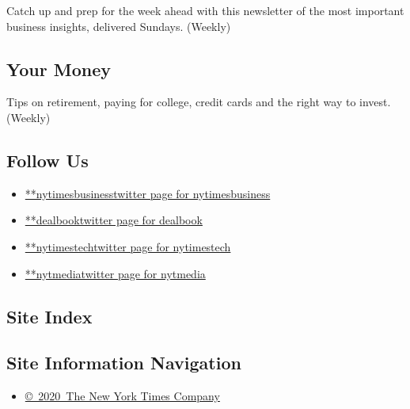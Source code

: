 Catch up and prep for the week ahead with this newsletter of the most
important business insights, delivered Sundays. (Weekly)

\hypertarget{your-money}{%
\subsection{Your Money}\label{your-money}}

Tips on retirement, paying for college, credit cards and the right way
to invest. (Weekly)

\hypertarget{follow-us}{%
\subsection{Follow Us}\label{follow-us}}

\begin{itemize}
\tightlist
\item
  \href{https://twitter.com/nytimesbusiness}{**nytimesbusinesstwitter
  page for nytimesbusiness}
\item
  \href{https://twitter.com/dealbook}{**dealbooktwitter page for
  dealbook}
\item
  \href{https://twitter.com/nytimestech}{**nytimestechtwitter page for
  nytimestech}
\item
  \href{https://twitter.com/nytmedia}{**nytmediatwitter page for
  nytmedia}
\end{itemize}

\hypertarget{site-index}{%
\subsection{Site Index}\label{site-index}}

\hypertarget{site-information-navigation}{%
\subsection{Site Information
Navigation}\label{site-information-navigation}}

\begin{itemize}
\tightlist
\item
  \href{https://help.nytimes.com/hc/en-us/articles/115014792127-Copyright-notice}{©~2020~The
  New York Times Company}
\end{itemize}

